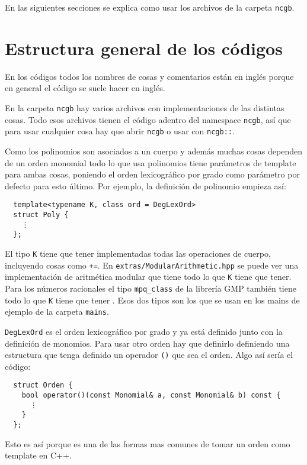\documentclass{report}
\theoremstyle{customstyle}
\theoremstyle{factstyle}
\begin{document}
En las siguientes secciones se explica como usar los archivos de la carpeta \texttt{ncgb}.

\section{Estructura general de los códigos}

En los códigos todos los nombres de cosas y comentarios están en inglés porque en general el código se suele hacer en inglés.

En la carpeta \texttt{ncgb} hay varios archivos con implementaciones de las distintas cosas. Todo esos archivos tienen el código adentro del namespace \texttt{ncgb}, así que para usar cualquier cosa hay que abrir \texttt{ncgb} o usar con \texttt{ncgb::}.

Como los polinomios son asociados a un cuerpo y además muchas cosas dependen de un orden monomial todo lo que usa polinomios tiene parámetros de template para ambas cosas, poniendo el orden lexicográfico por grado como parámetro por defecto para esto último. Por ejemplo, la definición de polinomio empieza así:

\begin{verbatim}
  template<typename K, class ord = DegLexOrd>
  struct Poly {
    ⋮
  };
\end{verbatim}

El tipo \texttt{K} tiene que tener implementadas todas las operaciones de cuerpo, incluyendo cosas como \texttt{+=}. En \texttt{extras/ModularArithmetic.hpp} se puede ver una implementación de aritmética modular que tiene todo lo que \texttt{K} tiene que tener. Para los números racionales el tipo \texttt{mpq\_class} de la librería GMP también tiene todo lo que \texttt{K} tiene que tener \cite{lib:gmp}. Esos dos tipos son los que se usan en los mains de ejemplo de la carpeta \texttt{mains}.

\texttt{DegLexOrd} es el orden lexicográfico por grado y ya está definido junto con la definición de monomios. Para usar otro orden hay que definirlo definiendo una estructura que tenga definido un operador \texttt{()} que sea el orden. Algo así sería el código:

\begin{verbatim}
  struct Orden {
    bool operator()(const Monomial& a, const Monomial& b) const {
      ⋮
    }
  };
\end{verbatim}

Esto es así porque es una de las formas mas comunes de tomar un orden como template en C++.
\end{document}
